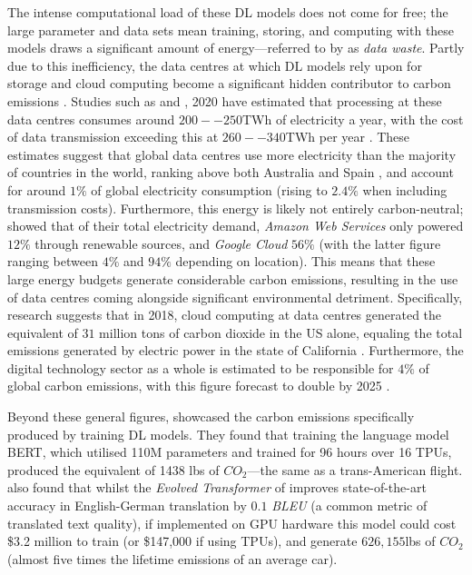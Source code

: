 \documentclass[a4paper, 11pt]{report}
\begin{document}
    The intense computational load of these DL models does not come for free; the large parameter and data sets mean training, storing, and computing with these models draws a significant amount of energy---referred to by \citet{bietti-2019} as \emph{data waste}. Partly due to this inefficiency, the data centres at which DL models rely upon for storage and cloud computing become a significant hidden contributor to carbon emissions \citep{aljarrah-2015}. Studies such as \citet{masanet-2020} and \citet{malmodin-2018}, 2020 have estimated that processing at these data centres consumes around $200--250$TWh of electricity a year, with the cost of data transmission exceeding this at $260--340$TWh per year \citep{iea-2022}. These estimates suggest that global data centres use more electricity than the majority of countries in the world, ranking above both Australia and Spain \citep{eia-2019}, and account for around $1\%$ of global electricity consumption (rising to $2.4\%$ when including transmission costs). Furthermore, this energy is likely not entirely carbon-neutral; \citet{cook-2017} showed that of their total electricity demand, \emph{Amazon Web Services} only powered $12\%$ through renewable sources, and \emph{Google Cloud} $56\%$ (with the latter figure ranging between $4\%$ and $94\%$ depending on location). This means that these large energy budgets generate considerable carbon emissions, resulting in the use of data centres coming alongside significant environmental detriment. Specifically, research suggests that in 2018, cloud computing at data centres generated the equivalent of $31$ million tons of carbon dioxide \citep{hockstad-2018} in the US alone, equaling the total emissions generated by electric power in the state of California \citep{iea-2022}. Furthermore, the digital technology sector as a whole is estimated to be responsible for $4\%$ of global carbon emissions, with this figure forecast to double by 2025 \citep{bietti-2019}.

    Beyond these general figures, \citet{strubell-2019} showcased the carbon emissions specifically produced by training DL models. They found that training the language model BERT, which utilised 110M parameters and trained for 96 hours over 16 TPUs, produced the equivalent of 1438 lbs of $CO_2$---the same as a trans-American flight. \citeauthor{strubell-2019} also found that whilst the \emph{Evolved Transformer} of \citet{so-2019} improves state-of-the-art accuracy in English-German translation by $0.1$ \emph{BLEU} (a common metric of translated text quality), if implemented on GPU hardware this model could cost \$3.2 million to train (or \$147,000 if using TPUs), and generate $626,155$lbs of $CO_2$ (almost five times the lifetime emissions of an average car).
\end{document}
